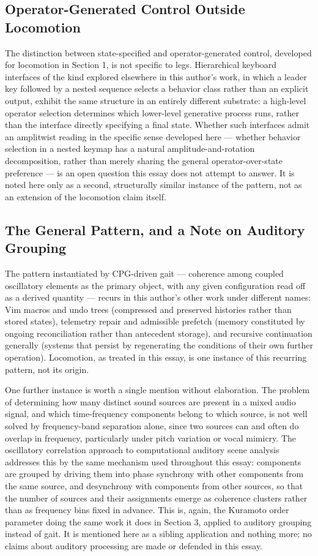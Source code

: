 \documentclass[12pt]{article}
\begin{document}
\subsection{Operator-Generated Control Outside Locomotion}

The distinction between state-specified and operator-generated control, developed for locomotion in Section 1, is not specific to legs. Hierarchical keyboard interfaces of the kind explored elsewhere in this author's work, in which a leader key followed by a nested sequence selects a behavior class rather than an explicit output, exhibit the same structure in an entirely different substrate: a high-level operator selection determines which lower-level generative process runs, rather than the interface directly specifying a final state. Whether such interfaces admit an amplitwist reading in the specific sense developed here — whether behavior selection in a nested keymap has a natural amplitude-and-rotation decomposition, rather than merely sharing the general operator-over-state preference — is an open question this essay does not attempt to answer. It is noted here only as a second, structurally similar instance of the pattern, not as an extension of the locomotion claim itself.

\subsection{The General Pattern, and a Note on Auditory Grouping}

The pattern instantiated by CPG-driven gait — coherence among coupled oscillatory elements as the primary object, with any given configuration read off as a derived quantity — recurs in this author's other work under different names: Vim macros and undo trees (compressed and preserved histories rather than stored states), telemetry repair and admissible prefetch (memory constituted by ongoing reconciliation rather than antecedent storage), and recursive continuation generally (systems that persist by regenerating the conditions of their own further operation). Locomotion, as treated in this essay, is one instance of this recurring pattern, not its origin.

One further instance is worth a single mention without elaboration. The problem of determining how many distinct sound sources are present in a mixed audio signal, and which time-frequency components belong to which source, is not well solved by frequency-band separation alone, since two sources can and often do overlap in frequency, particularly under pitch variation or vocal mimicry. The oscillatory correlation approach to computational auditory scene analysis addresses this by the same mechanism used throughout this essay: components are grouped by driving them into phase synchrony with other components from the same source, and desynchrony with components from other sources, so that the number of sources and their assignments emerge as coherence clusters rather than as frequency bins fixed in advance. This is, again, the Kuramoto order parameter doing the same work it does in Section 3, applied to auditory grouping instead of gait. It is mentioned here as a sibling application and nothing more; no claims about auditory processing are made or defended in this essay.
\end{document}
